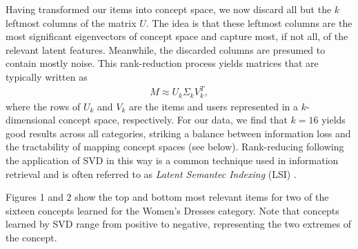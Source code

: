 \documentclass[11pt]{article}
\begin{document}
Having transformed our items into concept space, we now discard all but the $k$
leftmost columns of the matrix $U$. The idea is that these leftmost columns are
the most significant eigenvectors of concept space and capture most, if not all,
of the relevant latent features. Meanwhile, the discarded columns are presumed
to contain mostly noise. This rank-reduction process yields matrices that are
typically written as
\begin{align}
M \approx U_k \Sigma_k V^T_k,
\end{align}
where the rows of $U_k$ and $V_k$ are the items and users represented in a
$k$-dimensional concept space, respectively. For our data, we find that $k=16$
yields good results across all categories, striking a balance between
information loss and the tractability of mapping concept spaces (see below).
Rank-reducing following the application of SVD in this way is a common technique
used in information retrieval and is often referred to as {\em Latent Semantec
Indexing} (LSI) \cite{Deerwester1990}.

Figures 1 and 2 show the top and bottom most relevant items for two of the sixteen
concepts learned for the Women's Dresses category. Note that concepts learned by
SVD range from positive to negative, representing the two extremes of the
concept. 
\end{document}
